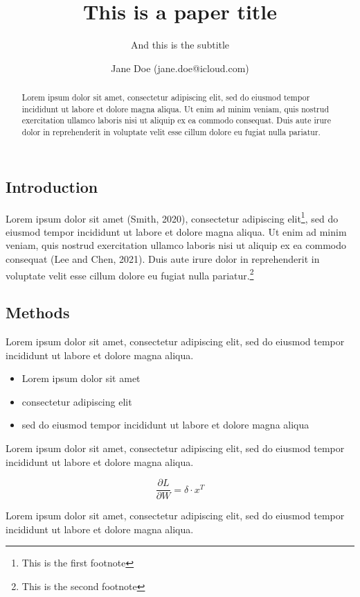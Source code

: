 \documentclass[
]{article}
\title{This is a paper title}
\subtitle{And this is the subtitle}
\author{Jane Doe (jane.doe@icloud.com)}
\date{}
\providecommand{\tightlist}{%
  \setlength{\itemsep}{0pt}\setlength{\parskip}{0pt}}
\providecommand{\tightlist}{
  \setlength{\itemsep}{0pt}\setlength{\parskip}{0pt}}
\begin{document}
\maketitle
\begin{abstract}
Lorem ipsum dolor sit amet, consectetur adipiscing elit, sed do eiusmod
tempor incididunt ut labore et dolore magna aliqua. Ut enim ad minim
veniam, quis nostrud exercitation ullamco laboris nisi ut aliquip ex ea
commodo consequat. Duis aute irure dolor in reprehenderit in voluptate
velit esse cillum dolore eu fugiat nulla pariatur.
\end{abstract}

\subsection{Introduction}\label{introduction}

Lorem ipsum dolor sit amet (Smith, 2020), consectetur adipiscing
elit\footnote{This is the first footnote}, sed do eiusmod tempor
incididunt ut labore et dolore magna aliqua. Ut enim ad minim veniam,
quis nostrud exercitation ullamco laboris nisi ut aliquip ex ea commodo
consequat (Lee and Chen, 2021). Duis aute irure dolor in reprehenderit
in voluptate velit esse cillum dolore eu fugiat nulla
pariatur.\footnote{This is the second footnote}

\subsection{Methods}\label{methods}

Lorem ipsum dolor sit amet, consectetur adipiscing elit, sed do eiusmod
tempor incididunt ut labore et dolore magna aliqua.

\begin{itemize}
\tightlist
\item
  Lorem ipsum dolor sit amet
\item
  consectetur adipiscing elit
\item
  sed do eiusmod tempor incididunt ut labore et dolore magna aliqua
\end{itemize}

Lorem ipsum dolor sit amet, consectetur adipiscing elit, sed do eiusmod
tempor incididunt ut labore et dolore magna aliqua.

\begin{equation}
\frac{\partial L}{\partial W} = \delta \cdot x^T
\end{equation}

Lorem ipsum dolor sit amet, consectetur adipiscing elit, sed do eiusmod
tempor incididunt ut labore et dolore magna aliqua.
\end{document}
